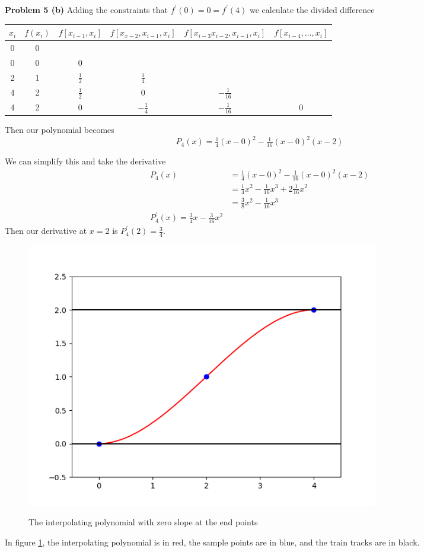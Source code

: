 \documentclass[12pt]{article}
\newcommand{\problem}[1]{\hspace{-4 ex} \large \textbf{Problem #1} }
\begin{document}
\problem{5 (b)} Adding the constraints that $f^\prime(0) = 0 = f^\prime(4)$ we calculate the divided difference

	\begin{center}
		\begin{tabular}{|c|c|c|c|c|c|}\hline
			$x_i$ & $f(x_i)$ & $f[x_{i-1},x_i]$ & $f[x_{x-2}, x_{i-1}, x_i]$ & $f[ x_{i-3}x_{i-2}, x_{i-1}, x_i]$ & $f[ x_{i-4},\dots, x_i]$ \\ \hline
			0 &0 & & & & \\ \hline
			0 &0 & 0 & & & \\ \hline
			2 &1 & $\tfrac{1}{2}$ & $\tfrac{1}{4}$ & & \\ \hline
			4 &2 & $\tfrac{1}{2}$ & 0 & $-\tfrac{1}{16}$ & \\ \hline
			4 &2 & 0 &  $-\tfrac{1}{4}$ & $-\tfrac{1}{16}$ & 0 \\ \hline
		\end{tabular}
	\end{center}

	Then our polynomial becomes
	$$
	P_4(x) = \tfrac{1}{4}(x-0)^2 - \tfrac{1}{16}(x-0)^2(x-2)
	$$
	
	We can simplify this and take the derivative
	\begin{align*}
		P_4(x) & = \tfrac{1}{4}(x-0)^2 - \tfrac{1}{16}(x-0)^2(x-2) \\
		& = \tfrac{1}{4}x^2 - \tfrac{1}{16}x^3 + 2\tfrac{1}{16}x^2 \\
		& = \tfrac{3}{8}x^2 - \tfrac{1}{16}x^3\\
		P_4^\prime(x) = \tfrac{3}{4}x - \tfrac{3}{16}x^2
	\end{align*}
	Then our derivative at $x=2$ is $P_4^\prime(2) = \tfrac{3}{4}$.

	\begin{figure}[H]
		\caption{The interpolating polynomial with zero slope at the end points}
		\includegraphics[width=0.75\textwidth]{hw4_figure_6}
		\centering
		\label{fig:p5b}
	\end{figure}
	In figure \ref{fig:p5b}, the interpolating polynomial is in red, the sample points are in blue, and the train tracks are in black. \bigbreak
	
\end{document}
